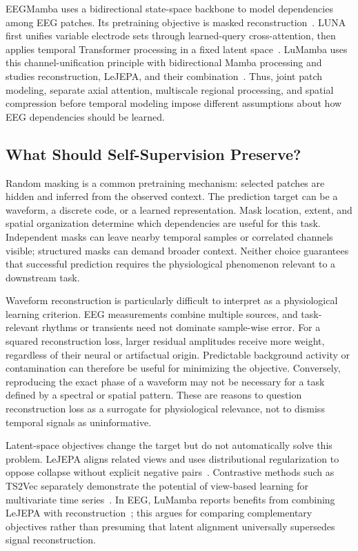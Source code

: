 \documentclass{article}
\begin{document}
EEGMamba uses a bidirectional state-space backbone to model dependencies
among EEG patches. Its pretraining objective is masked
reconstruction~\cite{wang2025eegmamba}.
LUNA first unifies variable electrode sets through learned-query
cross-attention, then applies temporal Transformer processing in a fixed
latent space~\cite{doner2025luna}. LuMamba uses this channel-unification
principle with bidirectional Mamba processing and studies reconstruction,
LeJEPA, and their combination~\cite{broustail2026lumamba}. Thus, joint patch
modeling, separate axial attention, multiscale regional processing, and
spatial compression before temporal modeling impose different assumptions
about how EEG dependencies should be learned.

\subsection{What Should Self-Supervision Preserve?}

Random masking is a common pretraining mechanism: selected patches are
hidden and inferred from the observed context. The prediction target can
be a waveform, a discrete code, or a learned representation. Mask location,
extent, and spatial organization determine which dependencies are useful
for this task. Independent masks can leave nearby temporal samples or
correlated channels visible; structured masks can demand broader context.
Neither choice guarantees that successful prediction requires the
physiological phenomenon relevant to a downstream task.

Waveform reconstruction is particularly difficult to interpret as a
physiological learning criterion. EEG measurements combine multiple sources,
and task-relevant rhythms or transients need not dominate sample-wise error.
For a squared reconstruction loss, larger residual amplitudes receive more
weight, regardless of their neural or artifactual origin. Predictable
background activity or contamination can therefore be useful for minimizing
the objective. Conversely, reproducing the exact phase of a waveform may
not be necessary for a task defined by a spectral or spatial pattern.
These are reasons to question reconstruction loss as a surrogate for
physiological relevance, not to dismiss temporal signals as uninformative.

Latent-space objectives change the target but do not automatically solve
this problem. LeJEPA aligns related views and uses distributional
regularization to oppose collapse without explicit negative
pairs~\cite{balestriero2025lejepa}. Contrastive methods such as TS2Vec
separately demonstrate the potential of view-based learning for multivariate
time series~\cite{yue2022ts2vec}. In EEG, LuMamba reports benefits from
combining LeJEPA with reconstruction~\cite{broustail2026lumamba}; this argues
for comparing complementary objectives rather than presuming that latent
alignment universally supersedes signal reconstruction.
\end{document}
